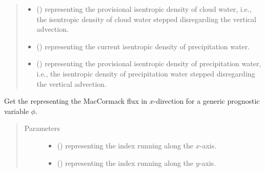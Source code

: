 \documentclass[letterpaper,10pt,english]{sphinxmanual}
\begin{document}
\begin{fulllineitems}
\begin{fulllineitems}
\begin{quote}
\begin{description}
\begin{itemize}
\item {} 
 () \textendash{}  representing the provisional isentropic density of cloud water,
i.e., the isentropic density of cloud water stepped disregarding the vertical advection.

\item {} 
 () \textendash{}  representing the current isentropic density of precipitation water.

\item {} 
 () \textendash{}  representing the provisional isentropic density of precipitation water,
i.e., the isentropic density of precipitation water stepped disregarding the vertical advection.

\end{itemize}

\end{description}\end{quote}

\end{fulllineitems}


\begin{fulllineitems}
\label{\detokenize{api:tasmania.dycore.flux_isentropic_maccormack.FluxIsentropicMacCormack._get_maccormack_flux_x}}
Get the  representing the MacCormack flux in \(x\)-direction
for a generic prognostic variable \(\phi\).
\begin{quote}\begin{description}
\item[{Parameters}] \leavevmode\begin{itemize}
\item {} 
 () \textendash{}  representing the index running along the \(x\)-axis.

\item {} 
 () \textendash{}  representing the index running along the \(y\)-axis.


\end{itemize}
\end{description}
\end{quote}
\end{fulllineitems}
\end{fulllineitems}
\end{document}
